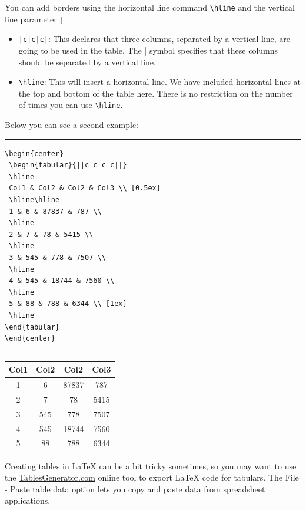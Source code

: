 \documentclass[12pt]{article}
\begin{document}
You can add borders using the horizontal line command \verb+\hline+ and the vertical line parameter \texttt{|}.
    \begin{itemize}
        \item \texttt{|c|c|c|}: This declares that three columns, separated by a vertical line, are going to be used in the table. The | symbol specifies that these columns should be separated by a vertical line.
        \item \verb+\hline+: This will insert a horizontal line. We have included horizontal lines at the top and bottom of the table here. There is no restriction on the number of times you can use \verb+\hline+.
    \end{itemize}
\bigskip    
\begin{minipage}{\linewidth}
Below you can see a second example:\bigskip
\hrule
\begin{lstlisting}
\begin{center}
 \begin{tabular}{||c c c c||} 
 \hline
 Col1 & Col2 & Col2 & Col3 \\ [0.5ex] 
 \hline\hline
 1 & 6 & 87837 & 787 \\ 
 \hline
 2 & 7 & 78 & 5415 \\
 \hline
 3 & 545 & 778 & 7507 \\
 \hline
 4 & 545 & 18744 & 7560 \\
 \hline
 5 & 88 & 788 & 6344 \\ [1ex] 
 \hline
\end{tabular}
\end{center}
\end{lstlisting}\hrule\bigskip

\begin{center}
 \begin{tabular}{||c c c c||} 
 \hline
 Col1 & Col2 & Col2 & Col3 \\ [0.5ex] 
 \hline\hline
 1 & 6 & 87837 & 787 \\ 
 \hline
 2 & 7 & 78 & 5415 \\
 \hline
 3 & 545 & 778 & 7507 \\
 \hline
 4 & 545 & 18744 & 7560 \\
 \hline
 5 & 88 & 788 & 6344 \\ [1ex] 
 \hline
\end{tabular}
\end{center}

\end{minipage}\bigskip
 
Creating tables in LaTeX can be a bit tricky sometimes, so you may want to use the \href{https://www.tablesgenerator.com/}{TablesGenerator.com} online tool to export LaTeX code for tabulars. The File - Paste table data option lets you copy and paste data from spreadsheet applications.
\end{document}
